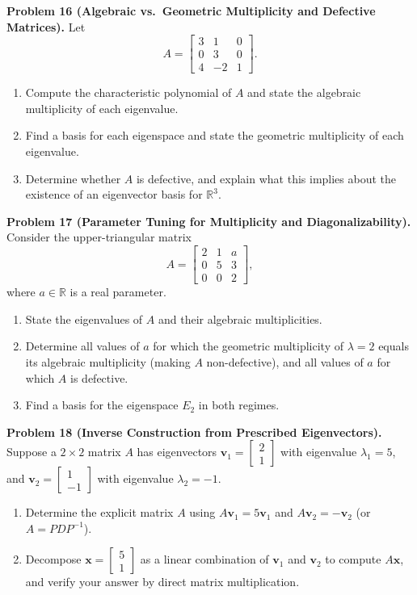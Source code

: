 \documentclass[11pt, letterpaper]{article}
\theoremstyle{definition}
\theoremstyle{remark}
\begin{document}
\textbf{Problem 16 (Algebraic vs.\ Geometric Multiplicity and Defective Matrices).}
Let
\[
A = \begin{bmatrix} 3 & 1 & 0 \\ 0 & 3 & 0 \\ 4 & -2 & 1 \end{bmatrix}.
\]
\begin{enumerate}[label=(\alph*)]
    \item Compute the characteristic polynomial of $A$ and state the algebraic multiplicity of each eigenvalue.
    \item Find a basis for each eigenspace and state the geometric multiplicity of each eigenvalue.
    \item Determine whether $A$ is defective, and explain what this implies about the existence of an eigenvector basis for $\mathbb{R}^3$.
\end{enumerate}

\textbf{Problem 17 (Parameter Tuning for Multiplicity and Diagonalizability).}
Consider the upper-triangular matrix
\[
A = \begin{bmatrix} 2 & 1 & a \\ 0 & 5 & 3 \\ 0 & 0 & 2 \end{bmatrix},
\]
where $a \in \mathbb{R}$ is a real parameter.
\begin{enumerate}[label=(\alph*)]
    \item State the eigenvalues of $A$ and their algebraic multiplicities.
    \item Determine all values of $a$ for which the geometric multiplicity of $\lambda = 2$ equals its algebraic multiplicity (making $A$ non-defective), and all values of $a$ for which $A$ is defective.
    \item Find a basis for the eigenspace $E_2$ in both regimes.
\end{enumerate}

\textbf{Problem 18 (Inverse Construction from Prescribed Eigenvectors).}
Suppose a $2 \times 2$ matrix $A$ has eigenvectors $\mathbf{v}_1 = \begin{bmatrix} 2 \\ 1 \end{bmatrix}$ with eigenvalue $\lambda_1 = 5$, and $\mathbf{v}_2 = \begin{bmatrix} 1 \\ -1 \end{bmatrix}$ with eigenvalue $\lambda_2 = -1$.
\begin{enumerate}[label=(\alph*)]
    \item Determine the explicit matrix $A$ using $A\mathbf{v}_1 = 5\mathbf{v}_1$ and $A\mathbf{v}_2 = -\mathbf{v}_2$ (or $A = P D P^{-1}$).
    \item Decompose $\mathbf{x} = \begin{bmatrix} 5 \\ 1 \end{bmatrix}$ as a linear combination of $\mathbf{v}_1$ and $\mathbf{v}_2$ to compute $A\mathbf{x}$, and verify your answer by direct matrix multiplication.
\end{enumerate}
\end{document}
